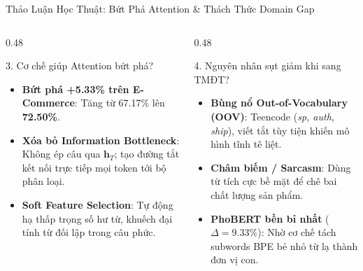 \documentclass[aspectratio=169, 10pt]{beamer}
\begin{document}
\begin{frame}{Thảo Luận Học Thuật: Bứt Phá Attention \& Thách Thức Domain Gap}
  \begin{columns}[T, onlytextwidth]
    \begin{column}{0.48\textwidth}
      \begin{block}{3. Cơ chế giúp Attention bứt phá?}
        \fontsize{7.5}{9.5}\selectfont
        \begin{itemize}\setlength{\itemsep}{0.2em}
          \item \textbf{Bứt phá +5.33\% trên E-Commerce}: Tăng từ 67.17\% lên \textbf{72.50\%}.
          \item \textbf{Xóa bỏ Information Bottleneck}: Không ép câu qua $\mathbf{h}_T$; tạo đường tắt kết nối trực tiếp mọi token tới bộ phân loại.
          \item \textbf{Soft Feature Selection}: Tự động hạ thấp trọng số hư từ, khuếch đại tính từ đối lập trong câu phức.
        \end{itemize}
      \end{block}
    \end{column}
    \hfill
    \begin{column}{0.48\textwidth}
      \begin{alertblock}{4. Nguyên nhân sụt giảm khi sang TMĐT?}
        \fontsize{7.5}{9.5}\selectfont
        \begin{itemize}\setlength{\itemsep}{0.2em}
          \item \textbf{Bùng nổ Out-of-Vocabulary (OOV)}: Teencode (\textit{sp, auth, ship}), viết tắt tùy tiện khiến mô hình tĩnh tê liệt.
          \item \textbf{Châm biếm / Sarcasm}: Dùng từ tích cực bề mặt để chê bai chất lượng sản phẩm.
          \item \textbf{PhoBERT bền bỉ nhất} ($\Delta = 9.33\%$): Nhờ cơ chế tách subwords BPE bẻ nhỏ từ lạ thành đơn vị con.
        \end{itemize}
      \end{alertblock}
    \end{column}
  \end{columns}
\end{frame}
\end{document}
